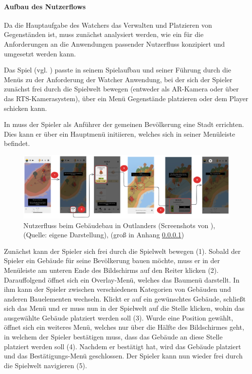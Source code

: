 \paragraph{Aufbau des Nutzerflows}
Da die Hauptaufgabe des Watchers das Verwalten und Platzieren von Gegenständen ist, muss zunächst analysiert werden, wie ein für die Anforderungen an die Anwendungen passender Nutzerfluss konzipiert und umgesetzt werden kann.

Das Spiel  (vgl. \cite{noauthor_outlanders_2025}) passte in seinem Spielaufbau und seiner Führung durch die Menüs zu der Anforderung der Watcher Anwendung, bei der sich der Spieler zunächst frei durch die Spielwelt bewegen (entweder als \ac{AR}-Kamera oder über das RTS-Kamerasystem), über ein Menü Gegenstände platzieren oder dem Player schicken kann.

In  muss der Spieler als Anführer der gemeinen Bevölkerung eine Stadt errichten. Dies kann er über ein Hauptmenü initiieren, welches sich in seiner Menüleiste befindet.

\begin{figure}[ht]
\centering
\includegraphics[width=1\linewidth]{content/pictures/Nutzerflow.png}
\caption{Nutzerfluss beim Gebäudebau in Outlanders (Screenshots von \cite{coates_game_nodate}), (Quelle: eigene Darstellung), (groß in Anhang \ref{})}
\label{fig:userflow-outlanders-build}
\end{figure}

Zunächst kann der Spieler sich frei durch die Spielwelt bewegen (1). Sobald der Spieler ein Gebäude für seine Bevölkerung bauen möchte, muss er in der Menüleiste am unteren Ende des Bildschirms auf den Reiter  klicken (2). Darauffolgend öffnet sich ein Overlay-Menü, welches das Baumenü darstellt. In ihm kann der Spieler zwischen verschiedenen Kategorien von Gebäuden und anderen Bauelementen wechseln. Klickt er auf ein gewünschtes Gebäude, schließt sich das Menü und er muss nun in der Spielwelt auf die Stelle klicken, wohin das ausgewählte Gebäude platziert werden soll (3). Wurde eine Position gewählt, öffnet sich ein weiteres Menü, welches nur über die Hälfte des Bildschirmes geht, in welchem der Spieler bestätigen muss, dass das Gebäude an diese Stelle platziert werden soll (4). Nachdem er bestätigt hat, wird das Gebäude platziert und das Bestätigungs-Menü geschlossen. Der Spieler kann nun wieder frei durch die Spielwelt navigieren (5).

